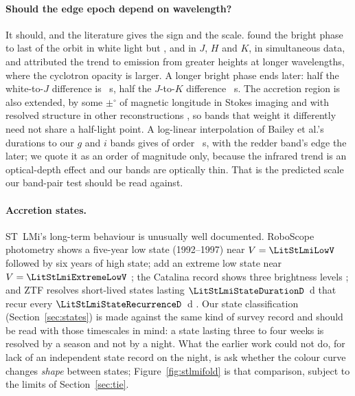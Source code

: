 \paragraph{Should the edge epoch depend on wavelength?}
It should, and the literature gives the sign and the scale.
\citet{bailey1985} found the bright phase to last \LitStLmiDurWhite{} of
the orbit in white light but \LitStLmiDurJ{}, \LitStLmiDurH{} and
\LitStLmiDurK{} in $J$, $H$ and $K$, in simultaneous data, and attributed
the trend to emission from greater heights at longer wavelengths, where the
cyclotron opacity is larger.  A longer bright phase ends later: half the
white-to-$J$ difference is \LitStLmiChromWhiteJS{}~s, half the $J$-to-$K$
difference \LitStLmiChromJKS{}~s.  The accretion region is also extended,
by some $\pm$\LitStLmiExtentDeg$^{\circ}$ of magnetic longitude in Stokes
imaging \citep{potter2000} and with resolved structure in other
reconstructions \citep{cropper1994, stockman1996}, so bands that weight it
differently need not share a half-light point.  A log-linear interpolation
of Bailey et al.'s durations to our $g$ and $i$ bands gives of order
\LitStLmiChromGIS{}~s, with the redder band's edge the later; we quote it
as an order of magnitude only, because the infrared trend is an
optical-depth effect and our bands are optically thin.  That is the
predicted scale our band-pair test should be read against.

\paragraph{Accretion states.}
ST~LMi's long-term behaviour is unusually well documented.  RoboScope
photometry \citep{kafka2005} shows a five-year low state (1992--1997) near
$V = \LitStLmiLowV$ followed by six years of high state; \citet{kafka2007}
add an extreme low state near $V = \LitStLmiExtremeLowV$
\citep[see also][]{howell2000}; the Catalina record shows three brightness
levels \citep{mason2017}; and ZTF resolves short-lived states lasting
$\LitStLmiStateDurationD$~d that recur every $\LitStLmiStateRecurrenceD$~d
\citep{duffy2022}.  Our state classification (Section~\ref{sec:states}) is
made against the same kind of survey record and should be read with those
timescales in mind: a state lasting three to four weeks is resolved by a
season and not by a night.
What the earlier work could not do, for lack of an independent state record
on the night, is ask whether the colour curve changes \emph{shape} between
states; Figure~\ref{fig:stlmifold} is that comparison, subject to the limits
of Section~\ref{sec:tie}.

